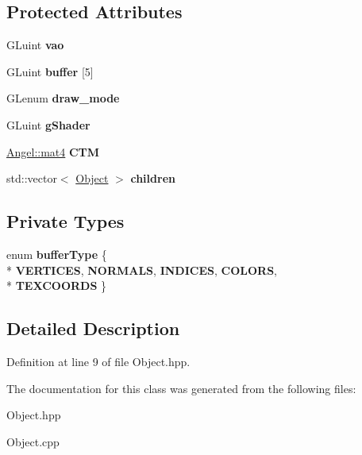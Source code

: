 \subsection*{Protected Attributes}
\begin{DoxyCompactItemize}
\item 
\hypertarget{class_object_a66190fee29d03d6478516686cbd01eb8}{G\-Luint {\bfseries vao}}\label{class_object_a66190fee29d03d6478516686cbd01eb8}

\item 
\hypertarget{class_object_a5af1a967c6487d9a76f7a26c9c83e646}{G\-Luint {\bfseries buffer} \mbox{[}5\mbox{]}}\label{class_object_a5af1a967c6487d9a76f7a26c9c83e646}

\item 
\hypertarget{class_object_a82764b385767d989f27d301ab206acb8}{G\-Lenum {\bfseries draw\-\_\-mode}}\label{class_object_a82764b385767d989f27d301ab206acb8}

\item 
\hypertarget{class_object_a750782f8b8c5d53bfa6ea614e079729c}{G\-Luint {\bfseries g\-Shader}}\label{class_object_a750782f8b8c5d53bfa6ea614e079729c}

\item 
\hypertarget{class_object_a2cd107c747ea674c28216b9ccd160f38}{\hyperlink{class_angel_1_1mat4}{Angel\-::mat4} {\bfseries C\-T\-M}}\label{class_object_a2cd107c747ea674c28216b9ccd160f38}

\item 
\hypertarget{class_object_a8913b59fc17424e984c599b9335ab69b}{std\-::vector$<$ \hyperlink{class_object}{Object} $>$ {\bfseries children}}\label{class_object_a8913b59fc17424e984c599b9335ab69b}

\end{DoxyCompactItemize}
\subsection*{Private Types}
\begin{DoxyCompactItemize}
\item 
enum {\bfseries buffer\-Type} \{ \\*
{\bfseries V\-E\-R\-T\-I\-C\-E\-S}, 
{\bfseries N\-O\-R\-M\-A\-L\-S}, 
{\bfseries I\-N\-D\-I\-C\-E\-S}, 
{\bfseries C\-O\-L\-O\-R\-S}, 
\\*
{\bfseries T\-E\-X\-C\-O\-O\-R\-D\-S}
 \}
\end{DoxyCompactItemize}


\subsection{Detailed Description}


Definition at line 9 of file Object.\-hpp.



The documentation for this class was generated from the following files\-:\begin{DoxyCompactItemize}
\item 
Object.\-hpp\item 
Object.\-cpp\end{DoxyCompactItemize}
